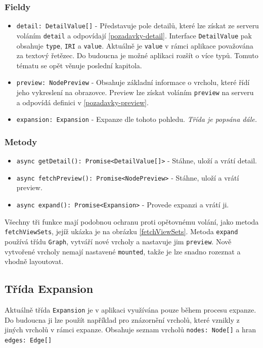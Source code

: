\subsubsection*{Fieldy}
\begin{itemize}
  \item \texttt{detail: DetailValue[]} - Představuje pole detailů, které lze získat ze serveru voláním \texttt{detail} a odpovídají \ref{pozadavky-detail}. Interface \texttt{DetailValue} pak obsahuje \texttt{type}, \texttt{IRI} a \texttt{value}. Aktuálně je \texttt{value} v rámci aplikace považována za textový řetězec. Do budoucna je možné aplikaci rozšít o více typů. Tomuto tématu se opět věnuje poslední kapitola.
  \item \texttt{preview: NodePreview} - Obsahuje základní informace o vrcholu, které řídí jeho vykreslení na obrazovce. Preview lze získat voláním \texttt{preview} na serveru a odpovídá definici v \ref{pozadavky-preview}.
  \item \texttt{expansion: Expansion} - Expanze dle tohoto pohledu. \textit{Třída je popsána dále.}
\end{itemize}

\subsubsection*{Metody}
\begin{itemize}
  \item \texttt{async getDetail(): Promise<DetailValue[]>} - Stáhne, uloží a vrátí detail.
  \item \texttt{async fetchPreview(): Promise<NodePreview>} - Stáhne, uloží a vrátí preview.
  \item \texttt{async expand(): Promise<Expansion>} - Provede expanzi a vrátí ji.
\end{itemize}

Všechny tři funkce mají podobnou ochranu proti opětovnému volání, jako metoda \texttt{fetchViewSets}, jejíž ukázka je na obrázku \ref{fetchViewSets}. Metoda \texttt{expand} používá třídu \texttt{Graph}, vytváří nové vrcholy a nastavuje jim \texttt{preview}. Nově vytvořené vrcholy nemají nastavené \texttt{mounted}, takže je lze snadno rozeznat a vhodně layoutovat.

\subsection{Třída Expansion}
Aktuálně třída \texttt{Expansion} je v aplikaci využívána pouze během procesu expanze. Do budoucna ji lze použít například pro znázornění vrcholů, které vznikly z jiných vrcholů v rámci expanze. Obsahuje seznam vrcholů \texttt{nodes: Node[]} a hran \texttt{edges: Edge[]}

